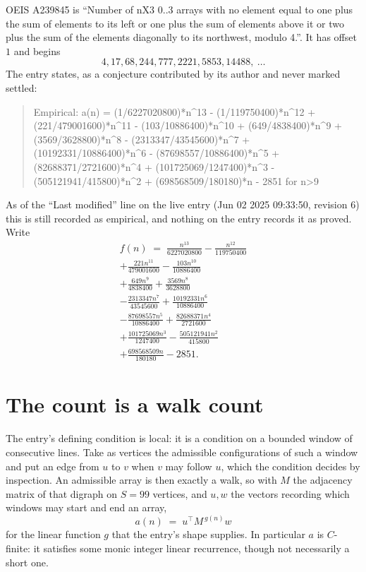 \documentclass[11pt,a4paper]{article}
\theoremstyle{plain}
\theoremstyle{definition}
\begin{document}
OEIS A239845 is ``Number of nX3 0..3 arrays with no element equal to one plus the sum of elements to its left or one plus the sum of elements above it or two plus the sum of the elements diagonally to its northwest, modulo 4.''. It has offset $1$ and begins
\[
4, 17, 68, 244, 777, 2221, 5853, 14488,\ \dots
\]
The entry states, as a conjecture contributed by its author and never marked settled:
\begin{quote}
Empirical: a(n) = (1/6227020800)*n\^{}13 - (1/119750400)*n\^{}12 + (221/479001600)*n\^{}11 - (103/10886400)*n\^{}10 + (649/4838400)*n\^{}9 + (3569/3628800)*n\^{}8 - (2313347/43545600)*n\^{}7 + (10192331/10886400)*n\^{}6 - (87698557/10886400)*n\^{}5 + (82688371/2721600)*n\^{}4 + (101725069/1247400)*n\^{}3 - (505121941/415800)*n\^{}2 + (698568509/180180)*n - 2851 for n>9
\end{quote}
As of the ``Last modified'' line on the live entry (Jun 02 2025 09:33:50, revision 6) this is still
recorded as empirical, and nothing on the entry records it as proved. Write
\begin{multline*}
f(n)\;=\;\frac{n^{13}}{6227020800} - \frac{n^{12}}{119750400} \\
+ \frac{221 n^{11}}{479001600} - \frac{103 n^{10}}{10886400} \\
+ \frac{649 n^{9}}{4838400} + \frac{3569 n^{8}}{3628800} \\
- \frac{2313347 n^{7}}{43545600} + \frac{10192331 n^{6}}{10886400} \\
- \frac{87698557 n^{5}}{10886400} + \frac{82688371 n^{4}}{2721600} \\
+ \frac{101725069 n^{3}}{1247400} - \frac{505121941 n^{2}}{415800} \\
+ \frac{698568509 n}{180180} - 2851.
\end{multline*}

\section{The count is a walk count}

The entry's defining condition is local: it is a condition on a bounded window of consecutive lines. Take as vertices the
admissible configurations of such a window and put an edge from $u$ to $v$ when $v$ may
follow $u$, which the condition decides by inspection. An admissible array is then exactly a
walk, so with $M$ the adjacency matrix of that digraph on $S=99$ vertices, and $u,w$ the
vectors recording which windows may start and end an array,
\[
a(n)\;=\;u^{\!\top}M^{\,g(n)}w
\]
for the linear function $g$ that the entry's shape supplies. In particular $a$ is
$C$-finite: it satisfies some monic integer linear recurrence, though not necessarily a short
one.
\end{document}

